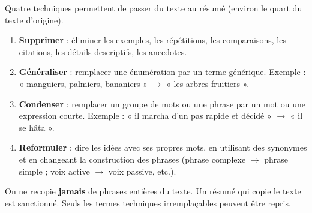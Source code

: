 \documentclass[11pt]{article}
\begin{document}
\begin{methode}
Quatre techniques permettent de passer du texte au résumé (environ le quart du texte d'origine).
\begin{enumerate}
\item \textbf{Supprimer} : éliminer les exemples, les répétitions, les comparaisons, les citations, les détails descriptifs, les anecdotes.
\item \textbf{Généraliser} : remplacer une énumération par un terme générique. Exemple : « manguiers, palmiers, bananiers » $\rightarrow$ « les arbres fruitiers ».
\item \textbf{Condenser} : remplacer un groupe de mots ou une phrase par un mot ou une expression courte. Exemple : « il marcha d'un pas rapide et décidé » $\rightarrow$ « il se hâta ».
\item \textbf{Reformuler} : dire les idées avec ses propres mots, en utilisant des synonymes et en changeant la construction des phrases (phrase complexe $\rightarrow$ phrase simple ; voix active $\rightarrow$ voix passive, etc.).
\end{enumerate}
\end{methode}

\begin{attention}[Interdit]
On ne recopie \textbf{jamais} de phrases entières du texte. Un résumé qui copie le texte est sanctionné. Seuls les termes techniques irremplaçables peuvent être repris.
\end{attention}
\end{document}
